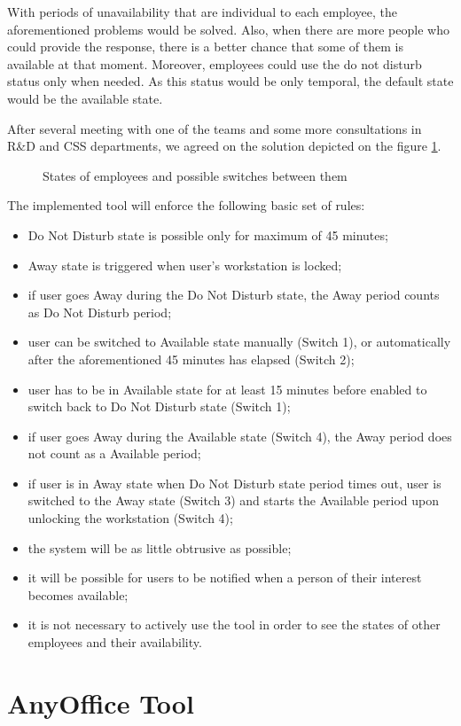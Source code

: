 \documentclass[11pt,singleside]{myfithesis2}
\newcommand{\pict}[4]{
	\begin{figure}[h!]
  		\vspace{-7px}
  		\centerline{\fcolorbox{darkgray}{palegray}{\texttt{[image: \#2]}}}
  		\caption{#1}
  		\label{#4}
	\end{figure}
}
\begin{document}
With periods of unavailability that are individual to each employee, the aforementioned problems would be solved. Also, when there are more people who could provide the response, there is a better chance that some of them is available at that moment. Moreover, employees could use the do not disturb status only when needed. As this status would be only temporal, the default state would be the available state.

After several meeting with one of the teams and some more consultations in R\&D and CSS departments, we agreed on the solution depicted on the figure \ref{pic:states}.

\pict{States of employees and possible switches between them}{data/States.png}{width=0.8\textwidth}{pic:states}

The implemented tool will enforce the following basic set of rules:
\begin{itemize}
	\item Do Not Disturb state is possible only for maximum of 45 minutes;
	\item Away state is triggered when user's workstation is locked;
	\item if user goes Away during the Do Not Disturb state, the Away period counts as Do Not Disturb period;
	\item user can be switched to Available state manually (Switch 1), or automatically after the aforementioned 45 minutes has elapsed (Switch 2);
	\item user has to be in Available state for at least 15 minutes before enabled to switch back to Do Not Disturb state (Switch 1);
	\item if user goes Away during the Available state (Switch 4), the Away period does not count as a Available period;
	\item if user is in Away state when Do Not Disturb state period times out, user is switched to the Away state (Switch 3) and starts the Available period upon unlocking the workstation (Switch 4);
	\item the system will be as little obtrusive as possible;
	\item it will be possible for users to be notified when a person of their interest becomes available;
	\item it is not necessary to actively use the tool in order to see the states of other employees and their availability.
\end{itemize}


\chapter{AnyOffice Tool}
\end{document}

